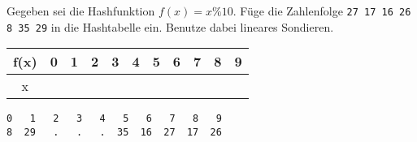 
\renewcommand{\arraystretch}{2.0}
\setlength{\tabcolsep}{14pt}
\question[2]
Gegeben sei die Hashfunktion $f(x) = x \% 10$.
Füge die Zahlenfolge
\texttt{27 17 16 26 8 35 29}  in die Hashtabelle ein.
Benutze dabei lineares Sondieren.

\begin{tabular}{|c|c|c|c|c|c|c|c|c|c|c|}
\hline f(x) & 0 & 1 & 2 & 3 & 4 & 5 & 6 & 7 & 8 & 9 \\
\hline x     &   &    &    &   &   &    &    &   &   & \\
\hline
\end{tabular}

\ifprintanswers
\begin{solutionbox}{2cm}
\begin{lstlisting}
0   1   2   3   4   5   6   7   8   9
8  29   .   .   .  35  16  27  17  26
\end{lstlisting}
\end{solutionbox}
\fi
